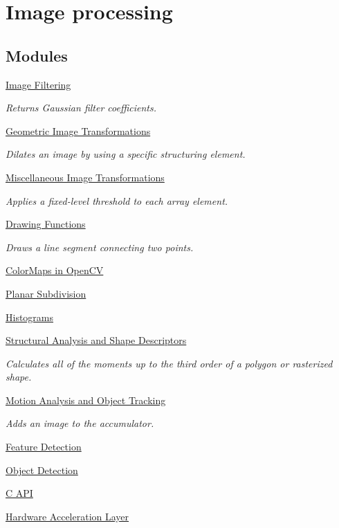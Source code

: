 \hypertarget{group__imgproc}{}\section{Image processing}
\label{group__imgproc}
\subsection*{Modules}
\begin{DoxyCompactItemize}
\item 
\hyperlink{group__imgproc__filter}{Image Filtering}
\begin{DoxyCompactList}\small\item\em Returns Gaussian filter coefficients. \end{DoxyCompactList}\item 
\hyperlink{group__imgproc__transform}{Geometric Image Transformations}
\begin{DoxyCompactList}\small\item\em Dilates an image by using a specific structuring element. \end{DoxyCompactList}\item 
\hyperlink{group__imgproc__misc}{Miscellaneous Image Transformations}
\begin{DoxyCompactList}\small\item\em Applies a fixed-\/level threshold to each array element. \end{DoxyCompactList}\item 
\hyperlink{group__imgproc__draw}{Drawing Functions}
\begin{DoxyCompactList}\small\item\em Draws a line segment connecting two points. \end{DoxyCompactList}\item 
\hyperlink{group__imgproc__colormap}{Color\+Maps in Open\+CV}
\item 
\hyperlink{group__imgproc__subdiv2d}{Planar Subdivision}
\item 
\hyperlink{group__imgproc__hist}{Histograms}
\item 
\hyperlink{group__imgproc__shape}{Structural Analysis and Shape Descriptors}
\begin{DoxyCompactList}\small\item\em Calculates all of the moments up to the third order of a polygon or rasterized shape. \end{DoxyCompactList}\item 
\hyperlink{group__imgproc__motion}{Motion Analysis and Object Tracking}
\begin{DoxyCompactList}\small\item\em Adds an image to the accumulator. \end{DoxyCompactList}\item 
\hyperlink{group__imgproc__feature}{Feature Detection}
\item 
\hyperlink{group__imgproc__object}{Object Detection}
\item 
\hyperlink{group__imgproc__c}{C A\+PI}
\item 
\hyperlink{group__imgproc__hal}{Hardware Acceleration Layer}
\end{DoxyCompactItemize}
